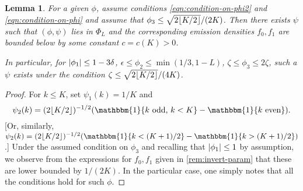 \documentclass[journal]{IEEEtran}
\newtheorem{lemma}{Lemma}
\newcommand{\1}{\boldsymbol{1}}
\DeclarePairedDelimiter{\braces}{\{}{\}}
\DeclarePairedDelimiter{\abs}{\lvert}{\rvert}
\DeclarePairedDelimiter{\floor}{\lfloor}{\rfloor}
\newcommand{\II}{\mathbbm{1}}
\begin{document}
\begin{lemma}\label{lem:exists-psi}
	For a given $\phi$, assume conditions \eqref{eqn:condition-on-phi2} and \eqref{eqn:condition-on-phi} and assume that $\phi_3\leq \sqrt{2 \floor{K/2}}/(2K)$.
	Then there exists $\psi$ such that $(\phi,\psi)$ lies in $\Phi_L$ and the corresponding emission densities $f_0,f_1$ are bounded below by some constant $c=c(K)>0$. %

	In particular, for $\abs{\phi_1}\leq 1-3\delta$, $\epsilon\leq \phi_2\leq \min(1/3,1-L)$, $\zeta\leq \phi_3\leq 2\zeta$, such a $\psi$ exists under the condition $\zeta\leq \sqrt{2 \floor{K/2}}/(4K)$. %
\end{lemma}
\begin{proof}
  For $k\leq K$, set $\psi_1(k)=1/K$ and 
  \begin{equation*}
    \psi_2(k)=(2\floor{K/2})^{-1/2} (\II\braces{k\textnormal{ odd, } k<K}-\II\braces{k\textnormal{ even}}).
  \end{equation*}
  [Or, similarly, $\psi_2(k)= (2\floor{K/2})^{-1/2} (\II\braces{k<(K+1)/2}-\II\braces{k>(K+1)/2})$.] Under the assumed condition on $\phi_3$ and recalling that $\abs{\phi_1}\leq 1$ by assumption, we observe from the expressions for $f_0,f_1$ given in \cref{rem:invert-param} that these are lower bounded by $1/(2K)$.
	In the particular case, one simply notes that all the conditions hold for such $\phi$.
\end{proof}
\end{document}
